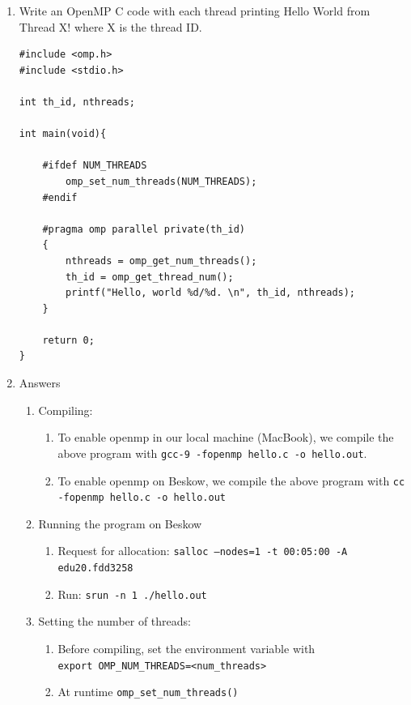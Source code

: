 \documentclass[12pt]{article}
\begin{document}
\begin{enumerate}
	\item Write an OpenMP C code with each thread printing Hello World from Thread X! where X is the thread ID.\\
	\begin{lstlisting}[style=CStyle]
#include <omp.h>
#include <stdio.h>

int th_id, nthreads;

int main(void){

	#ifdef NUM_THREADS
		omp_set_num_threads(NUM_THREADS);
	#endif

	#pragma omp parallel private(th_id)
	{
		nthreads = omp_get_num_threads();
		th_id = omp_get_thread_num();
		printf("Hello, world %d/%d. \n", th_id, nthreads);
	}

	return 0;
}
	\end{lstlisting}
	\item Answers
	\begin{enumerate}
	   \item Compiling:
	       \begin{enumerate}
	           \item To enable openmp in our local machine (MacBook), we compile the above program with \texttt{gcc-9 -fopenmp hello.c -o hello.out}.
		        \item To enable openmp on Beskow, we compile the above program with \texttt{cc -fopenmp hello.c -o hello.out}
	       \end{enumerate}
	    \item Running the program on Beskow
	    \begin{enumerate}
	        \item Request for allocation: \texttt{salloc --nodes=1 -t 00:05:00 -A edu20.fdd3258}
	        \item Run: \texttt{srun -n 1 ./hello.out}
	    \end{enumerate}
	    \item Setting the number of threads:
		    \begin{enumerate}
    			\item Before compiling, set the environment variable with\\
    			\texttt{export OMP\_NUM\_THREADS=<num\_threads>}
    			\item At runtime \texttt{omp\_set\_num\_threads()}
		\end{enumerate}
	\end{enumerate}
	
  
\end{enumerate}
\end{document}
